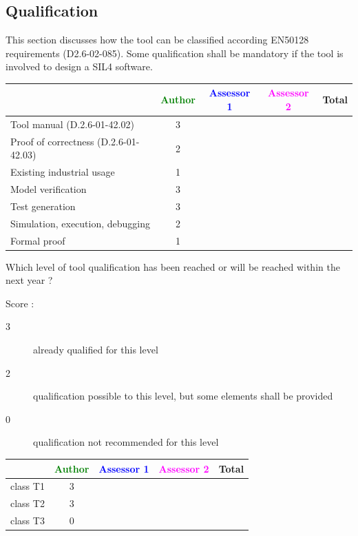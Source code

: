 \subsection{Qualification}

This section discusses how the tool can be classified according EN50128 requirements (D2.6-02-085). Some qualification shall be mandatory  if the tool is involved to design a SIL4 software.


\begin{tabular}{|l | c | c | c | c|}
\hline
& \textcolor{green}{Author} & \textcolor{blue}{Assessor 1} & \textcolor{magenta}{Assessor 2} & Total \\
\hline 
Tool manual (D.2.6-01-42.02) & 3 & & &  \\
\hline
Proof of correctness (D.2.6-01-42.03)   & 2 & & & \\
\hline
Existing industrial  usage  & 1 & & & \\
\hline
Model verification & 3 & & & \\
\hline
Test generation & 3 & & & \\
\hline
Simulation, execution, debugging & 2 & & & \\
\hline
Formal proof & 1 & & & \\
\hline
\end{tabular}

\begin{author_comment}
	
	
\end{author_comment}

Which level of tool qualification has been reached or will be reached within the next year ?

Score :
\begin{description}
\item[3] already qualified for this level
\item[2] qualification possible to this level, but some elements shall be provided
\item[0] qualification not recommended for this level
\end{description}


\begin{tabular}{|l | c | c | c | c|}
\hline
& \textcolor{green}{Author} & \textcolor{blue}{Assessor 1} & \textcolor{magenta}{Assessor 2} & Total \\
\hline 
class T1 & 3 & & &  \\
\hline
class T2   & 3 & & & \\
\hline
class T3  & 0 & & & \\
\hline
\end{tabular}


